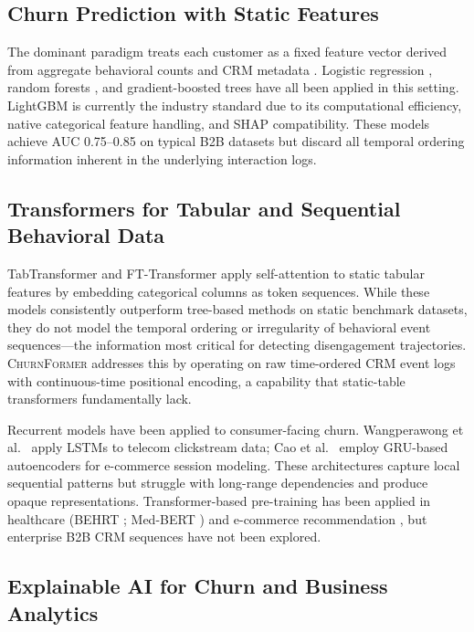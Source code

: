 \documentclass[review, 12pt]{elsarticle}
\newcommand{\model}{\textsc{ChurnFormer}}
\begin{document}
\subsection{Churn Prediction with Static Features}

The dominant paradigm treats each customer as a fixed feature vector derived
from aggregate behavioral counts and CRM metadata \cite{verbeke2012}.
Logistic regression \cite{lariviere2005}, random forests \cite{verbeke2012},
and gradient-boosted trees \cite{chen2016} have all been applied in this
setting.
LightGBM \cite{ke2017} is currently the industry standard due to its
computational efficiency, native categorical feature handling, and SHAP
compatibility.
These models achieve AUC 0.75--0.85 on typical B2B datasets but discard all
temporal ordering information inherent in the underlying interaction logs.

\subsection{Transformers for Tabular and Sequential Behavioral Data}

TabTransformer \cite{huang2020tabtransformer} and FT-Transformer
\cite{gorishniy2021} apply self-attention to static tabular features by
embedding categorical columns as token sequences.
While these models consistently outperform tree-based methods on static
benchmark datasets, they do not model the temporal ordering or irregularity
of behavioral event sequences---the information most critical for detecting
disengagement trajectories.
\model{} addresses this by operating on raw time-ordered CRM event logs with
continuous-time positional encoding, a capability that static-table
transformers fundamentally lack.

Recurrent models \cite{hochreiter1997} have been applied to consumer-facing
churn.
Wangperawong et al.\ \cite{wangperawong2016} apply LSTMs to telecom clickstream
data; Cao et al.\ \cite{cao2021} employ GRU-based autoencoders for e-commerce
session modeling.
These architectures capture local sequential patterns but struggle with
long-range dependencies and produce opaque representations.
Transformer-based pre-training \cite{devlin2019} has been applied in healthcare
(BEHRT \cite{li2020behrt}; Med-BERT \cite{rasmy2021}) and e-commerce
recommendation \cite{sun2019}, but enterprise B2B CRM sequences have not been
explored.

\subsection{Explainable AI for Churn and Business Analytics}
\end{document}
